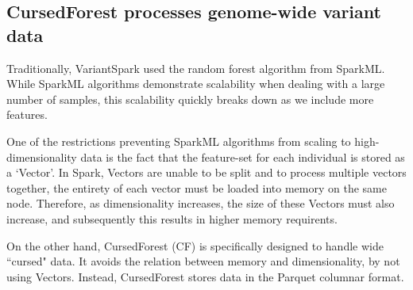 \documentclass[10pt,a4paper]{article}  %
\begin{document}
\subsection*{CursedForest processes genome-wide variant data}

Traditionally, VariantSpark used the random forest algorithm from SparkML. While SparkML algorithms demonstrate
scalability when dealing with a large number of samples, this scalability quickly breaks down as we include more features.

One of the restrictions preventing SparkML algorithms from scaling to high-dimensionality data is the fact that the feature-set
for each individual is stored as a `Vector'. In Spark, Vectors are unable to be split and to process multiple vectors together,
the entirety of each vector must be loaded into memory on the same node. Therefore, as dimensionality increases, the
size of these Vectors must also increase, and subsequently this results in higher memory requirents.

On the other hand, CursedForest (CF) is specifically designed to handle wide ``cursed" data. It avoids the relation between
memory and dimensionality, by not using Vectors. Instead, CursedForest stores data in the Parquet columnar format.
\end{document}
